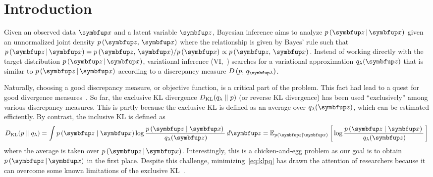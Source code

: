 
\section{Introduction}
Given an observed data \(\vx\) and a latent variable \(\vz\), Bayesian inference aims to analyze \(p\,(\vz\,|\,\vx)\) given an unnormalized joint density \(p\,(\vz,\,\vx)\) where the relationship is given by Bayes' rule such that \(p\,(\vz\,|\,\vx) = {p\,(\vz,\,\vx)}/{p\,(\vx)} \propto p\,(\vz,\,\vx)\).
Instead of working directly with the target distribution \(p\,(\vz\,|\,\vx)\), variational inference (VI,~\citealt{jordan_introduction_1999, blei_variational_2017, zhang_advances_2019}) searches for a variational approximation \(q_{\lambda}(\vz)\) that is similar to \(p\,(\vz\,|\,\vx)\) according to a discrepancy measure \(D\,(p,\, q_{\vlambda})\).

Naturally, choosing a good discrepancy measure, or objective function, is a critical part of the problem.
This fact had lead to a quest for good divergence measures~\citep{NIPS2016_7750ca35, NIPS2017_35464c84, NEURIPS2018_1cd138d0, pmlr-v97-ruiz19a}.
So far, the exclusive KL divergence \(D_{\mathrm{KL}}(q_{\lambda}\parallel p)\) (or reverse KL divergence) has been used ``exclusively'' among various discrepancy measures.
This is partly because the exclusive KL is defined as an average over \(q_{\lambda}(\vz)\), which can be estimated efficiently.
By contrast, the inclusive KL is defined as
%
\begin{align}
  \DKL{p}{q_{\lambda}} = \int p\,(\vz\mid\vx) \log \frac{p\,(\vz\mid\vx)\,}{\,q_{\lambda}(\vz)} \,d\vz
  = \Esub{p(\vz\mid\vx)}{\log \frac{p\,(\vz\mid\vx)\,}{\,q_{\lambda}(\vz)} } \label{eq:klpq}
\end{align}
%
\noindent where the average is taken over \(p\,(\vz\,|\,\vx)\). 
Interestingly, this is a chicken-and-egg problem as our goal is to obtain \(p\,(\vz\,|\,\vx)\) in the first place.
Despite this challenge, minimizing~\eqref{eq:klpq} has drawn the attention of researchers because it can overcome some known limitations of the exclusive KL~\citep{minka2005divergence, mackay_local_2001}.

